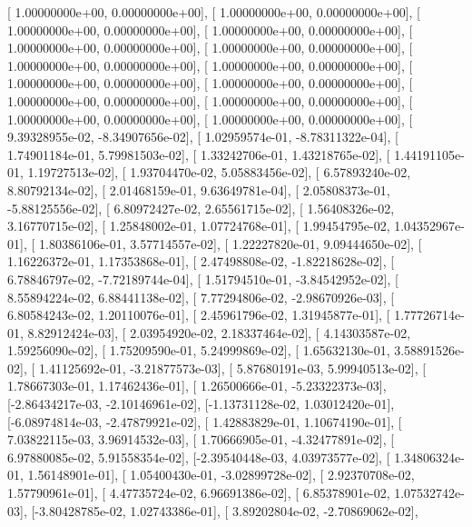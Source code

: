 \documentclass{article}
\begin{document}
       [ 1.00000000e+00,  0.00000000e+00],
       [ 1.00000000e+00,  0.00000000e+00],
       [ 1.00000000e+00,  0.00000000e+00],
       [ 1.00000000e+00,  0.00000000e+00],
       [ 1.00000000e+00,  0.00000000e+00],
       [ 1.00000000e+00,  0.00000000e+00],
       [ 1.00000000e+00,  0.00000000e+00],
       [ 1.00000000e+00,  0.00000000e+00],
       [ 1.00000000e+00,  0.00000000e+00],
       [ 1.00000000e+00,  0.00000000e+00],
       [ 1.00000000e+00,  0.00000000e+00],
       [ 1.00000000e+00,  0.00000000e+00],
       [ 1.00000000e+00,  0.00000000e+00],
       [ 1.00000000e+00,  0.00000000e+00],
       [ 9.39328955e-02, -8.34907656e-02],
       [ 1.02959574e-01, -8.78311322e-04],
       [ 1.74901184e-01,  5.79981503e-02],
       [ 1.33242706e-01,  1.43218765e-02],
       [ 1.44191105e-01,  1.19727513e-02],
       [ 1.93704470e-02,  5.05883456e-02],
       [ 6.57893240e-02,  8.80792134e-02],
       [ 2.01468159e-01,  9.63649781e-04],
       [ 2.05808373e-01, -5.88125556e-02],
       [ 6.80972427e-02,  2.65561715e-02],
       [ 1.56408326e-02,  3.16770715e-02],
       [ 1.25848002e-01,  1.07724768e-01],
       [ 1.99454795e-02,  1.04352967e-01],
       [ 1.80386106e-01,  3.57714557e-02],
       [ 1.22227820e-01,  9.09444650e-02],
       [ 1.16226372e-01,  1.17353868e-01],
       [ 2.47498808e-02, -1.82218628e-02],
       [ 6.78846797e-02, -7.72189744e-04],
       [ 1.51794510e-01, -3.84542952e-02],
       [ 8.55894224e-02,  6.88441138e-02],
       [ 7.77294806e-02, -2.98670926e-03],
       [ 6.80584243e-02,  1.20110076e-01],
       [ 2.45961796e-02,  1.31945877e-01],
       [ 1.77726714e-01,  8.82912424e-03],
       [ 2.03954920e-02,  2.18337464e-02],
       [ 4.14303587e-02,  1.59256090e-02],
       [ 1.75209590e-01,  5.24999869e-02],
       [ 1.65632130e-01,  3.58891526e-02],
       [ 1.41125692e-01, -3.21877573e-03],
       [ 5.87680191e-03,  5.99940513e-02],
       [ 1.78667303e-01,  1.17462436e-01],
       [ 1.26500666e-01, -5.23322373e-03],
       [-2.86434217e-03, -2.10146961e-02],
       [-1.13731128e-02,  1.03012420e-01],
       [-6.08974814e-03, -2.47879921e-02],
       [ 1.42883829e-01,  1.10674190e-01],
       [ 7.03822115e-03,  3.96914532e-03],
       [ 1.70666905e-01, -4.32477891e-02],
       [ 6.97880085e-02,  5.91558354e-02],
       [-2.39540448e-03,  4.03973577e-02],
       [ 1.34806324e-01,  1.56148901e-01],
       [ 1.05400430e-01, -3.02899728e-02],
       [ 2.92370708e-02,  1.57790961e-01],
       [ 4.47735724e-02,  6.96691386e-02],
       [ 6.85378901e-02,  1.07532742e-03],
       [-3.80428785e-02,  1.02743386e-01],
       [ 3.89202804e-02, -2.70869062e-02],
\end{document}
